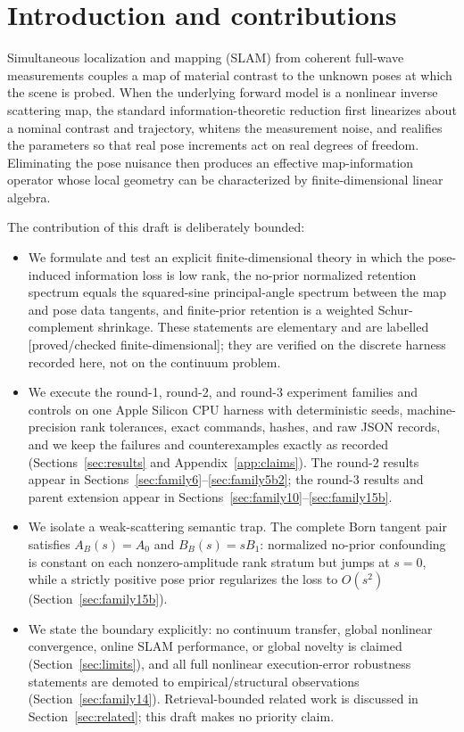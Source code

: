 \documentclass[12pt]{article}
\newcommand{\FDL}{\textnormal{[proved/checked finite-dimensional]}}
\begin{document}
\tableofcontents

\section{Introduction and contributions}\label{sec:intro}

Simultaneous localization and mapping (SLAM) from coherent full-wave
measurements couples a map of material contrast to the unknown poses at which
the scene is probed. When the underlying forward model is a nonlinear inverse
scattering map, the standard information-theoretic reduction first linearizes
about a nominal contrast and trajectory, whitens the measurement noise, and
realifies the parameters so that real pose increments act on real degrees of
freedom. Eliminating the pose nuisance then produces an effective
map-information operator whose local geometry can be characterized by
finite-dimensional linear algebra.

The contribution of this draft is deliberately bounded:
\begin{itemize}
\item We formulate and test an explicit finite-dimensional theory in which
the pose-induced information loss is low rank, the no-prior normalized
retention spectrum equals the squared-sine principal-angle spectrum between
the map and pose data tangents, and finite-prior retention is a weighted
Schur-complement shrinkage. These statements are elementary and are labelled
\FDL{}; they are verified on the discrete harness recorded here, not on the
continuum problem.
	\item We execute the round-1, round-2, and round-3 experiment families and
controls on one Apple Silicon CPU harness with deterministic seeds,
machine-precision rank tolerances, exact commands, hashes, and raw JSON
records, and we keep the failures and counterexamples exactly as recorded
(Sections~\ref{sec:results} and Appendix~\ref{app:claims}). The round-2
results appear in Sections~\ref{sec:family6}--\ref{sec:family5b2}; the
round-3 results and parent extension appear in
Sections~\ref{sec:family10}--\ref{sec:family15b}.
\item We isolate a weak-scattering semantic trap. The complete Born tangent
pair satisfies $A_B(s)=A_0$ and $B_B(s)=sB_1$: normalized no-prior confounding
is constant on each nonzero-amplitude rank stratum but jumps at $s=0$, while a
strictly positive pose prior regularizes the loss to $O(s^2)$
(Section~\ref{sec:family15b}).
\item We state the boundary explicitly: no continuum transfer, global
nonlinear convergence, online SLAM performance, or global novelty is claimed
(Section~\ref{sec:limits}), and all full nonlinear execution-error robustness
statements are demoted to empirical/structural observations
(Section~\ref{sec:family14}). Retrieval-bounded related work is discussed in
Section~\ref{sec:related}; this draft makes no priority claim.
\end{itemize}
\end{document}
